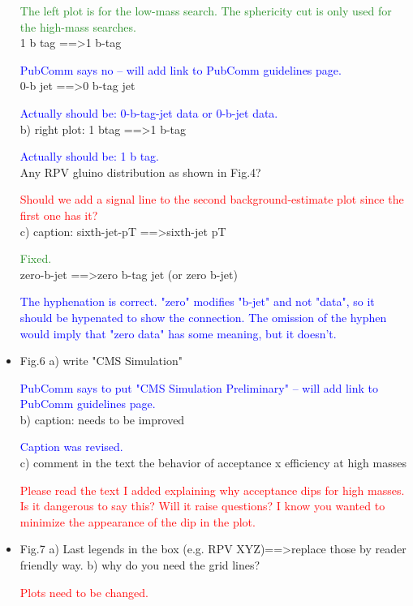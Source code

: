 \documentclass[paper=a4, fontsize=11pt]{scrartcl}
\begin{document}
\begin{itemize}
\textcolor{ForestGreen}{The left plot is for the low-mass search. The sphericity cut is only used for the
high-mass searches.}\\

1 b tag ==\textgreater 1 b-tag 

\textcolor{Blue}{PubComm says no -- will add link to PubComm guidelines page.}\\

0-b jet ==\textgreater 0 b-tag jet 

\textcolor{Blue}{Actually should be: 0-b-tag-jet data or 0-b-jet data.}\\

b) right plot: 
1 btag ==\textgreater 1 b-tag 

\textcolor{Blue}{Actually should be: 1 b tag.}\\

Any RPV gluino distribution as shown in Fig.4? 

\textcolor{Red}{Should we add a signal line to the second background-estimate plot since the first one has it?}\\

c) caption: 
sixth-jet-pT ==\textgreater sixth-jet pT 

\textcolor{ForestGreen}{Fixed.}\\

zero-b-jet ==\textgreater zero b-tag jet (or zero b-jet) 

\textcolor{Blue}{The hyphenation is correct. "zero" modifies "b-jet" and not "data", so it
should be hypenated to show the connection. The omission of the hyphen would imply that "zero data" has some meaning, but it doesn't.}\\

\item Fig.6 
a) write "CMS Simulation" 

\textcolor{Blue}{PubComm says to put "CMS Simulation Preliminary" -- will add link to PubComm guidelines page.}\\

b) caption: needs to be improved 

\textcolor{Blue}{Caption was revised.}\\

c) comment in the text the behavior of acceptance x efficiency at high masses 

\textcolor{Red}{Please read the text I added explaining why acceptance dips for high masses. Is it dangerous
to say this? Will it raise questions? I know you wanted to minimize the appearance of the dip in the plot.}\\


\item Fig.7 
a) Last legends in the box (e.g. RPV XYZ)==\textgreater replace those by reader friendly 
way. 
b) why do you need the grid lines? 

\textcolor{Red}{Plots need to be changed.}\\

\end{itemize}
\end{document}
